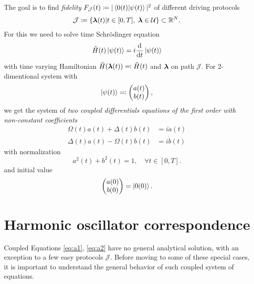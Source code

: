 The goal is to find \emph{fidelity} $F_{\mathcal J}(t)\coloneqq |\braket{0(t)|\psi(t)}|^2$ of different driving protocols \begin{equation}
    \mathcal J\coloneqq\{{\bm\lambda}(t)|t\in[0,T],\; {\bm\lambda}\in \mathcal U\} \subset \mathbb{R}^N.
\end{equation}
For this we need to solve time Schr\"odinger equation
\begin{equation}
    \hat{H}(t)\ket{\psi(t)}=i\frac{\mathrm{d}}{\mathrm{d} t}\ket{\psi(t)}
\end{equation}
with time varying Hamiltonian $\hat{H}({\bm\lambda}(t))\eqqcolon \hat{H}(t)$ and ${\bm\lambda}$ on path $\mathcal J$. For 2-dimentional system with 
\begin{equation}
    \ket{\psi(t)}\eqqcolon \begin{pmatrix}
         a(t) \\
         b(t)    
    \end{pmatrix},
\end{equation}
we get the system of \emph{two coupled differentials equations of the first order with non-constant coefficients}
\begin{align}
    \Omega(t)a(t)+\Delta(t)b(t)&=i\dot a(t)\label{eq:a1}\\
    \Delta(t)a(t)-\Omega(t)b(t)&=i\dot b(t)
    \label{eq:a2}
\end{align}
with normalization
\begin{equation}
    a^2(t)+b^2(t)=1, \quad \forall t\in [0,T].
    \label{eq:normalizationCondition}
\end{equation}
and initial value 
\begin{equation}
    \begin{pmatrix}
        a(0)\\b(0)
    \end{pmatrix} = \ket{0(0)}.
\end{equation}















\section{Harmonic oscillator correspondence}
Coupled Equations \ref{eq:a1}, \ref{eq:a2} have no general analytical solution, with an exception to a few easy protocols $\mathcal J$. Before moving to some of these special cases, it is important to understand the general behavior of such coupled system of equations.

